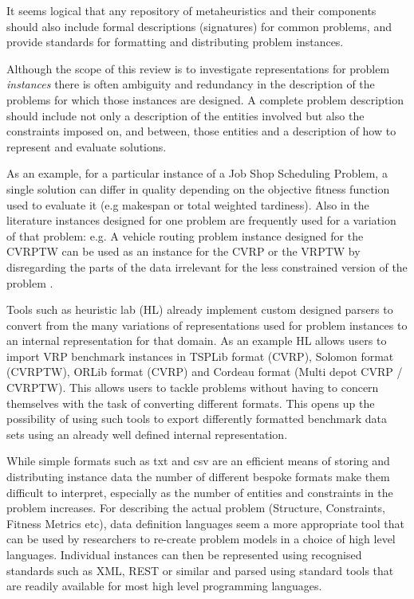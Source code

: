 \documentclass[a4paper]{article}
\begin{document}
It seems logical that any repository of metaheuristics and their components should also include formal descriptions (signatures) for common problems, and provide standards for formatting and distributing problem instances. 

Although the scope of this review is to investigate representations for problem \emph{instances} there is often ambiguity and redundancy in the description of the problems for which those instances are designed. 
A complete problem description should include not only a description of the entities involved but also the constraints imposed on, and between, those entities and a description of how to represent and evaluate solutions.

As an example, for a particular instance of a Job Shop Scheduling Problem, a single solution can differ in quality depending on the objective fitness function used to evaluate it (e.g makespan or total weighted tardiness).
Also in the literature instances designed for one problem are frequently used for a variation of that problem: e.g. A vehicle routing problem instance designed for the CVRPTW can be used as an instance for the CVRP or the VRPTW by disregarding the parts of the data irrelevant for the less constrained version of the problem . 

Tools such as heuristic lab (HL) already implement custom designed parsers to convert from the many variations of representations used for problem instances to an internal representation for that domain. 
As an example HL allows users to import VRP benchmark instances in TSPLib format (CVRP), Solomon format (CVRPTW), ORLib format (CVRP) and Cordeau format (Multi depot CVRP / CVRPTW).
This allows users to tackle problems without having to concern themselves with the task of converting different formats. This opens up the possibility of using such tools to export differently formatted benchmark data sets using an already well defined internal representation.

While simple formats such as txt and csv are an efficient means of storing and distributing instance data the number of different bespoke formats make them difficult to interpret, especially as the number of entities and constraints in the problem increases.
For describing the actual problem (Structure, Constraints, Fitness Metrics etc), data definition languages  seem a more appropriate tool that can be used by researchers to re-create problem models in a choice of high level languages. Individual instances can then be represented using recognised standards such as XML, REST or similar and parsed using standard tools that are readily available for most high level programming languages.
\end{document}

